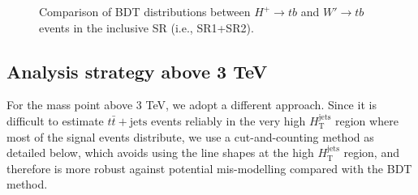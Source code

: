 \begin{description}
\begin{figure}[H]
{        }  
        \caption{Comparison of BDT distributions between $H^{+} \rightarrow tb$ and  $W' \rightarrow tb$ events in the inclusive SR (i.e., SR1+SR2).}
        \label{fig:CompHpAndWp}
    \end{figure}
    
\end{description}

\subsection{Analysis strategy above 3 TeV}
\label{subsec:AnaStrategyAbove3TeV}
For the mass point above 3 TeV, we adopt a different approach. Since it is difficult to estimate $t\bar{t}+\text{jets}$ events reliably in the very high $H_{\text{T}}^{\text{jets}}$ region where most of the signal events distribute, we use a cut-and-counting method as detailed below, which avoids using the line shapes at the high $H_{\text{T}}^{\text{jets}}$ region, and therefore is more robust against potential mis-modelling compared with the BDT method. 

